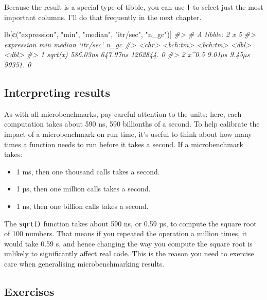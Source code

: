 \documentclass[]{book}
\newenvironment{Shaded}{\begin{snugshade}}{\end{snugshade}}
\newcommand{\CommentTok}[1]{\textcolor[rgb]{0.37,0.37,0.37}{\textit{#1}}}
\newcommand{\KeywordTok}[1]{\textcolor[rgb]{0.27,0.27,0.27}{\textbf{#1}}}
\newcommand{\NormalTok}[1]{#1}
\newcommand{\StringTok}[1]{\textcolor[rgb]{0.5,0.5,0.5}{#1}}
\providecommand{\tightlist}{%
  \setlength{\itemsep}{0pt}\setlength{\parskip}{0pt}}
\begin{document}
Because the result is a special type of tibble, you can use \texttt{{[}} to select just the most important columns. I'll do that frequently in the next chapter.

\begin{Shaded}
\begin{Highlighting}[]
\NormalTok{lb[}\KeywordTok{c}\NormalTok{(}\StringTok{"expression"}\NormalTok{, }\StringTok{"min"}\NormalTok{, }\StringTok{"median"}\NormalTok{, }\StringTok{"itr/sec"}\NormalTok{, }\StringTok{"n_gc"}\NormalTok{)]}
\CommentTok{#> # A tibble: 2 x 5}
\CommentTok{#>   expression      min   median `itr/sec`  n_gc}
\CommentTok{#>   <chr>      <bch:tm> <bch:tm>     <dbl> <dbl>}
\CommentTok{#> 1 sqrt(x)    586.03ns 647.97ns  1262844.     0}
\CommentTok{#> 2 x^0.5        9.01µs   9.45µs    99351.     0}
\end{Highlighting}
\end{Shaded}

\hypertarget{interpreting-results}{%
\subsection{Interpreting results}\label{interpreting-results}}

As with all microbenchmarks, pay careful attention to the units: here, each computation takes about 590 ns, 590 billionths of a second. To help calibrate the impact of a microbenchmark on run time, it's useful to think about how many times a function needs to run before it takes a second. If a microbenchmark takes:

\begin{itemize}
\tightlist
\item
  1 ms, then one thousand calls takes a second.
\item
  1 µs, then one million calls takes a second.
\item
  1 ns, then one billion calls takes a second.
\end{itemize}

The \texttt{sqrt()} function takes about 590 ns, or 0.59 µs, to compute the square root of 100 numbers. That means if you repeated the operation a million times, it would take 0.59 s, and hence changing the way you compute the square root is unlikely to significantly affect real code. This is the reason you need to exercise care when generalising microbenchmarking results.

\hypertarget{exercises-17}{%
\subsection{Exercises}\label{exercises-17}}
\end{document}
